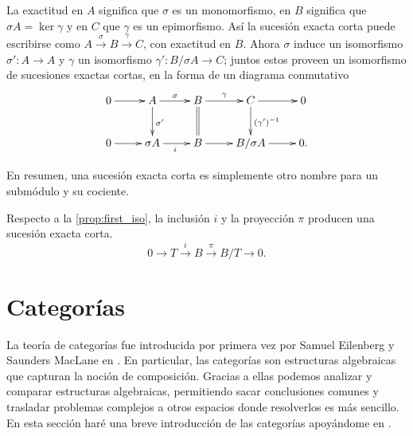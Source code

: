 La exactitud en \(A\) significa que \(\sigma\) es un monomorfismo, en \(B\) significa que \(\sigma A = \ker \gamma\) y en \(C\) que \(\gamma\) es un epimorfismo. Así la sucesión exacta corta puede escribirse como \(A \xrightarrow{\sigma} B \xrightarrow{\gamma} C\), con exactitud en \(B\). Ahora \(\sigma\) induce un isomorfismo \(\sigma': A \to A\) y \(\gamma\) un isomorfismo \(\gamma': B/\sigma A \to C\); juntos estos proveen un isomorfismo de sucesiones exactas cortas, en la forma de un diagrama conmutativo
\begin{equation}
    \label{exactshortseq}
    \xymatrix{
    0 \ar[r] & A \ar[r]^{\sigma} \ar[d]^{\sigma'} & B \ar[r]^\gamma \ar@{=}[d] & C \ar[r] \ar[d]^{(\gamma')^{-1}} & 0 \\
    0 \ar[r] & \sigma A \ar[r]_i & B \ar[r] & B/\sigma A \ar[r] & 0.
    }
\end{equation}

En resumen, una sucesión exacta corta es simplemente otro nombre para un submódulo y su cociente.

\begin{ejemplo}
	Respecto a la \autoref{prop:first_iso}, la inclusión \(i\) y la proyección \(\pi\) producen una sucesión exacta corta.
	\[ 0 \rightarrow T \xrightarrow{i} B \xrightarrow{\pi} B/T \rightarrow 0. \]
\end{ejemplo}

\section{Categorías}
\label{sec:cat}

La teoría de categorías fue introducida por primera vez por Samuel Eilenberg y Saunders MacLane en \cite{eilenberg1945general}. En particular, las categorías son estructuras algebraicas que capturan la noción de composición. Gracias a ellas podemos analizar y comparar estructuras algebraicas, permitiendo sacar conclusiones comunes y trasladar problemas complejos a otros espacios donde resolverlos es más sencillo. En esta sección haré una breve introducción de las categorías apoyándome en \cite{mac2013categories}.

